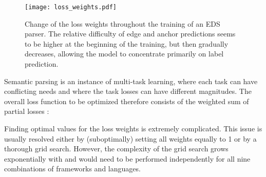 \documentclass[11pt,a4paper]{article}
\begin{document}
\begin{figure}
\texttt{[image: loss\_weights.pdf]}
\caption{Change of the loss weights throughout the training of an EDS parser. The relative difficulty of edge and anchor predictions seems to be higher at the beginning of the training, but then gradually decreases, allowing the model to concentrate primarily on label prediction.}
\label{fig:loss_weights}
\end{figure}


Semantic parsing is an instance of multi-task learning, where each task  can have conflicting needs and where the task losses  can have different magnitudes. The overall loss function  to be optimized therefore consists of the weighted sum of partial losses :



\noindent
Finding optimal values for the loss weights  is extremely complicated. This issue is usually resolved either by (suboptimally) setting all weights equally to 1 or by a thorough grid search. However, the complexity of the grid search grows exponentially with  and would need to be performed independently for all nine combinations of frameworks and languages.
\end{document}
